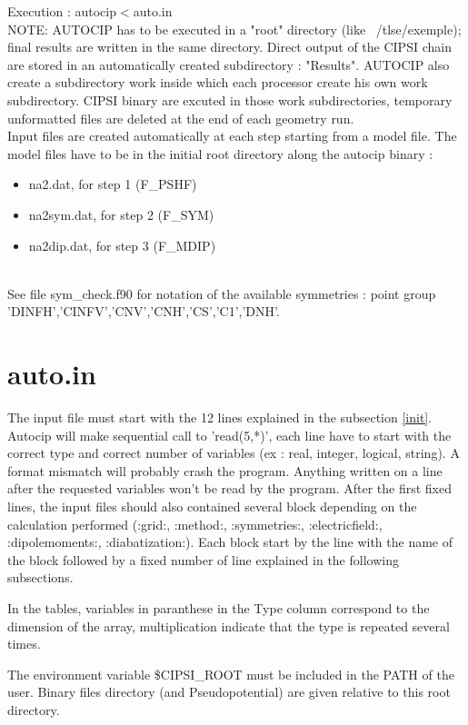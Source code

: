 \documentclass[a4paper,10pt]{article}
\begin{document}
Execution : autocip$<$auto.in
\\[12pt]
 NOTE: AUTOCIP has to be executed in a "root" directory (like ~/tlse/exemple); final results are written in the same directory. Direct output of the CIPSI chain are stored in an automatically created subdirectory : "Results". AUTOCIP also create a subdirectory work inside which each processor create his own work subdirectory. CIPSI binary are excuted in those work subdirectories, temporary unformatted files are deleted at the end of each geometry run.
\\[12pt]
 Input files are created automatically at each step starting from a model file. The model files have to be in the initial root directory along the autocip binary :
 \begin{itemize}
  \item{ na2.dat, for step 1  (F\_PSHF)}
  \item{ na2sym.dat, for step 2 (F\_SYM) } 
  \item{ na2dip.dat, for step 3 (F\_MDIP)}
\end{itemize}~
\\[12pt]
See file sym\_check.f90 for notation of the available symmetries : point group 'DINFH','CINFV','CNV','CNH','CS','C1','DNH'.

\section{auto.in}

The input file must start with the 12 lines explained in the subsection \ref{init}. Autocip will make sequential call to 'read(5,*)', each line have to start with the correct type and correct number of variables (ex : real, integer, logical, string). A format mismatch will probably crash the program. Anything written on a line after the requested variables won't be read by the program. After the first fixed lines, the input files should also contained several block depending on the calculation performed (:grid:, :method:, :symmetries:, :electricfield:, :dipolemoments:, :diabatization:). Each block start by the line with the name of the block followed by a fixed number of line explained in the following subsections.  


In the tables, variables in paranthese in the Type column correspond to the dimension of the array, multiplication indicate that the type is repeated several times.

The environment variable \$CIPSI\_ROOT must be included in the PATH of the user. Binary files directory (and Pseudopotential) are given relative to this root directory.
\end{document}
